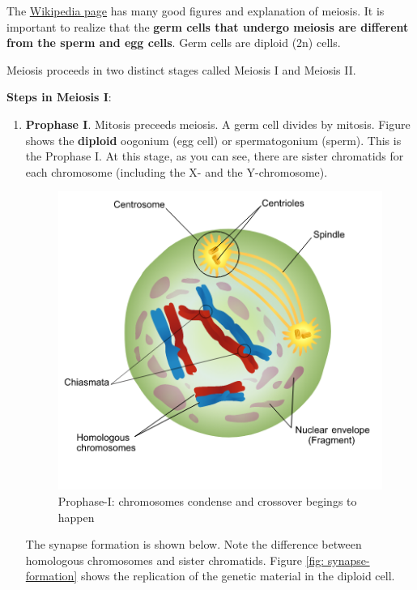 \documentclass[12pt]{article}
\begin{document}
\newpage

The \href{https://upload.wikimedia.org/wikipedia/commons/7/74/Meiosis_Stages.svg}{Wikipedia page} has many good figures and explanation of meiosis. It is important to realize that the \textbf{germ cells that undergo meiosis are different from the sperm and egg cells}. Germ cells are diploid (2n) cells. 

Meiosis proceeds in two distinct stages called Meiosis I and Meiosis II.

\textbf{Steps in Meiosis I}:
\begin{enumerate}
    \item \textbf{Prophase I}. Mitosis preceeds meiosis. A germ cell divides by mitosis. Figure shows the \textbf{diploid} oogonium (egg cell) or spermatogonium (sperm). This is the Prophase I. At this stage, as you can see, there are sister chromatids for each chromosome (including the X- and the Y-chromosome). 
\begin{figure}[h!]
    \centering
    \includegraphics[scale=0.4]{prophase-I.png}
    \caption{Prophase-I: chromosomes condense and crossover begings to happen}
    \label{fig: prophase-I}
\end{figure}
        The synapse formation is shown below. Note the difference between homologous chromosomes and sister chromatids. Figure \ref{fig: synapse-formation} shows the replication of the genetic material in the diploid cell. 
\begin{figure}[h!]
    \centering

\end{figure}
\end{enumerate}
\end{document}
